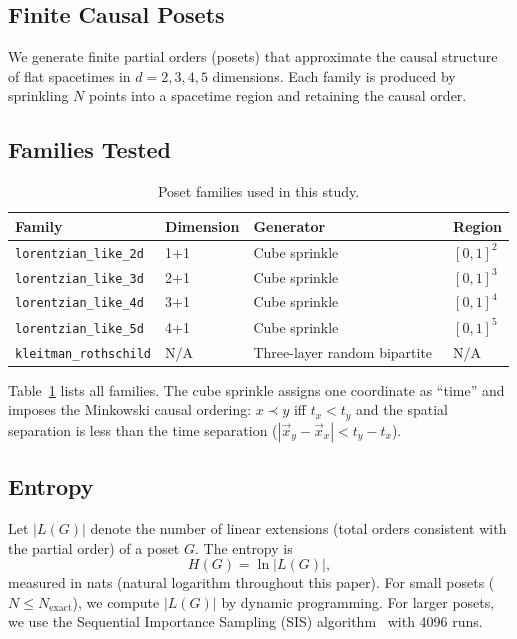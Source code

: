\documentclass[12pt,a4paper]{article}
\begin{document}
\subsection{Finite Causal Posets}
\label{sec:finite_posets}

We generate finite partial orders (posets) that approximate the causal structure of flat
spacetimes in $d = 2, 3, 4, 5$ dimensions. Each family is produced by sprinkling $N$ points
into a spacetime region and retaining the causal order.

\subsection{Families Tested}
\label{sec:families}

\begin{table}[htbp]
\centering
\caption{Poset families used in this study.}
\label{tab:families}
\begin{tabular}{@{}llll@{}}
\toprule
Family & Dimension & Generator & Region \\
\midrule
\texttt{lorentzian\_like\_2d} & 1+1 & Cube sprinkle & $[0,1]^2$ \\
\texttt{lorentzian\_like\_3d} & 2+1 & Cube sprinkle & $[0,1]^3$ \\
\texttt{lorentzian\_like\_4d} & 3+1 & Cube sprinkle & $[0,1]^4$ \\
\texttt{lorentzian\_like\_5d} & 4+1 & Cube sprinkle & $[0,1]^5$ \\
\texttt{kleitman\_rothschild} & N/A & Three-layer random bipartite~\cite{Kleitman1975} & N/A \\
\bottomrule
\end{tabular}
\end{table}

Table~\ref{tab:families} lists all families.
The cube sprinkle assigns one coordinate as ``time'' and imposes the Minkowski causal
ordering: $x \prec y$ iff $t_x < t_y$ and the spatial separation is less than the time
separation ($|\vec x_y - \vec x_x| < t_y - t_x$).

\subsection{Entropy}
\label{sec:entropy}

Let $|L(G)|$ denote the number of linear extensions (total orders consistent with the
partial order) of a poset $G$. The entropy is
\begin{equation}
H(G) = \ln |L(G)|,
\label{eq:entropy_def}
\end{equation}
measured in nats (natural logarithm throughout this paper).
For small posets ($N \leq N_\text{exact}$), we compute $|L(G)|$ by dynamic programming.
For larger posets, we use the Sequential Importance Sampling (SIS)
algorithm~\cite{Cunningham2020,Huber2006} with 4096 runs.
\end{document}
